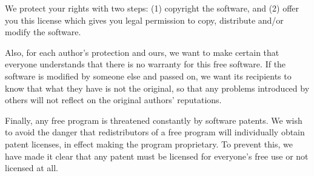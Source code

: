 {\begin{allononepageforgodssake}
We protect your rights with two steps: (1) copyright the software, and (2)
offer you this license which gives you legal permission to copy,
distribute and/or modify the software.

Also, for each author's protection and ours, we want to make certain that
everyone understands that there is no warranty for this free software.  If
the software is modified by someone else and passed on, we want its
recipients to know that what they have is not the original, so that any
problems introduced by others will not reflect on the original authors'
reputations.

Finally, any free program is threatened constantly by software patents.
We wish to avoid the danger that redistributors of a free program will
individually obtain patent licenses, in effect making the program
proprietary.  To prevent this, we have made it clear that any patent must
be licensed for everyone's free use or not licensed at all.
\end{allononepageforgodssake}}

